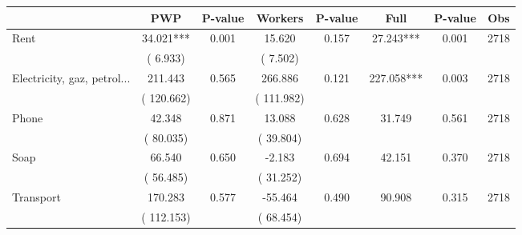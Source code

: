 
\begin{tabular}{l*{7}{c}}\hline&\multicolumn{1}{c}{PWP}&\multicolumn{1}{c}{P-value}&\multicolumn{1}{c}{Workers}&\multicolumn{1}{c}{P-value}&\multicolumn{1}{c}{Full}&\multicolumn{1}{c}{P-value}&\multicolumn{1}{c}{Obs} \\ \hline

 Rent       &             34.021***       &        0.001  &             15.620       &        0.157  &             27.243***       &              0.001 &  2718 \\ 
                       &       (       6.933)             &                               &       (       7.502)                     &                               &                                               &                                &                      \\ 

 Electricity, gaz, petrol...       &            211.443       &        0.565  &            266.886       &        0.121  &            227.058***       &              0.003 &  2718 \\ 
                       &       (     120.662)             &                               &       (     111.982)                     &                               &                                               &                                &                      \\ 

 Phone       &             42.348       &        0.871  &             13.088       &        0.628  &             31.749       &              0.561 &  2718 \\ 
                       &       (      80.035)             &                               &       (      39.804)                     &                               &                                               &                                &                      \\ 

 Soap       &             66.540       &        0.650  &             -2.183       &        0.694  &             42.151       &              0.370 &  2718 \\ 
                       &       (      56.485)             &                               &       (      31.252)                     &                               &                                               &                                &                      \\ 

 Transport       &            170.283       &        0.577  &            -55.464       &        0.490  &             90.908       &              0.315 &  2718 \\ 
                       &       (     112.153)             &                               &       (      68.454)                     &                               &                                               &                                &                      \\ 


\end{tabular}
